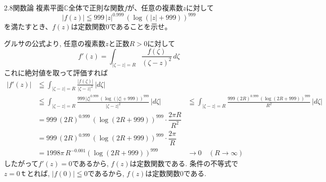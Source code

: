 \begin{prob}{2.8}{}{関数論}
複素平面$\mathbb{C}$全体で正則な関数$f$が、任意の複素数$z$に対して
\[
|f(z)|\leqq 999\,|z|^{0.999}\,(\log(|z|+999))^{999}
\]
を満たすとき、$f(z)$は定数関数$0$であることを示せ。
\end{prob}

グルサの公式より, 任意の複素数$z$と正数$R>0$に対して
\[f'(z) = \int_{|\zeta - z| = R} \frac{f(\zeta)}{(\zeta - z)^2} \, d\zeta \]
これに絶対値を取って評価すれば
\begin{align*}
|f'(z)| &\leqq \int_{|\zeta - z| = R} \frac{|f(\zeta)|}{|\zeta - z|^2} \, |d\zeta| \\
&\leqq \int_{|\zeta - z| = R} \frac{999\,|\zeta|^{0.999}\,(\log(|\zeta|+999))^{999}}{|\zeta - z|^2} \, |d\zeta|
&\leqq \int_{|\zeta - z| = R} \frac{999\,(2R)^{0.999}\,(\log(2R+999))^{999}}{R^2} \, |d\zeta| \\
&= 999\,(2R)^{0.999}\,(\log(2R+999))^{999} \cdot \dfrac{2\pi R}{R^2} \\
&= 999\,(2R)^{0.999}\,(\log(2R+999))^{999} \cdot \dfrac{2\pi}{R} \\
&= 1998\pi \, R^{-0.001} (\log(2R+999))^{999}
&\to 0 \quad (R \to \infty)
\end{align*}
したがって$f'(z)=0$であるから, $f(z)$は定数関数である.
条件の不等式で$z=0$ｔとれば, $|f(0)|\leqq 0$であるから, $f(z)$は定数関数$0$である.
